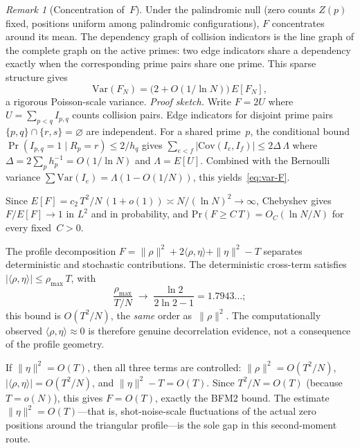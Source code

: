 \documentclass[11pt]{article}
\theoremstyle{definition}
\theoremstyle{remark}
\newtheorem{remark}[theorem]{Remark}
\begin{document}
\begin{remark}[Concentration of~$F$]
\label{rem:F-concentration}
Under the palindromic null (zero counts
$Z(p)$ fixed, positions uniform among
palindromic configurations),
$F$ concentrates around its mean.
The dependency graph of collision
indicators is the line graph of the
complete graph on the active primes:
two edge indicators share a dependency
exactly when the corresponding prime
pairs share one prime.
This sparse structure gives
\begin{equation}\label{eq:var-F}
  \mathrm{Var}(F_N)
  = \bigl(2 + O(1/\ln N)\bigr)\,
  E[F_N],
\end{equation}
a rigorous Poisson-scale variance.
\emph{Proof sketch.}
Write $F = 2U$ where
$U = \sum_{p < q} I_{p,q}$ counts
collision pairs.
Edge indicators for disjoint prime pairs
$\{p,q\} \cap \{r,s\} = \varnothing$
are independent.
For a shared prime~$p$, the conditional
bound
$\Pr(I_{p,q} = 1 \mid R_p = r)
\le 2/h_q$ gives
$\sum_{e < f}|\mathrm{Cov}(I_e, I_f)|
\le 2\Delta\,\Lambda$
where $\Delta = 2\sum_p h_p^{-1}
= O(1/\ln N)$
and $\Lambda = E[U]$.
Combined with the Bernoulli variance
$\sum \mathrm{Var}(I_e)
= \Lambda(1 - O(1/N))$,
this yields~\eqref{eq:var-F}.

Since $E[F] = c_2\,T^2/N\,(1 + o(1))
\asymp N/(\ln N)^2 \to \infty$,
Chebyshev gives $F/E[F] \to 1$
in $L^2$ and in probability,
and $\mathrm{Pr}(F \ge C\,T) =
O_C(\ln N/N)$ for every fixed~$C > 0$.

The profile decomposition
$F = \|\rho\|^2 + 2\langle\rho,\eta
\rangle + \|\eta\|^2 - T$ separates
deterministic and stochastic
contributions.
The deterministic cross-term satisfies
$|\langle\rho,\eta\rangle|
\le \rho_{\max}\,T$, with
\[
  \frac{\rho_{\max}}{T/N}
  \;\longrightarrow\;
  \frac{\ln 2}{2\ln 2 - 1}
  = 1.7943\ldots;
\]
this bound is $O(T^2/N)$, the
\emph{same} order as~$\|\rho\|^2$.
The computationally observed
$\langle\rho,\eta\rangle \approx 0$ is
therefore genuine decorrelation
evidence, not a consequence of the
profile geometry.

If $\|\eta\|^2 = O(T)$, then all three
terms are controlled:
$\|\rho\|^2 = O(T^2/N)$,
$|\langle\rho,\eta\rangle| = O(T^2/N)$,
and $\|\eta\|^2 - T = O(T)$.
Since $T^2/N = O(T)$ (because
$T = o(N)$), this gives
$F = O(T)$, exactly the BFM2 bound.
The estimate $\|\eta\|^2 = O(T)$---that
is, shot-noise-scale fluctuations of the
actual zero positions around the
triangular profile---is the sole gap in this
second-moment route.
\end{remark}
\end{document}
